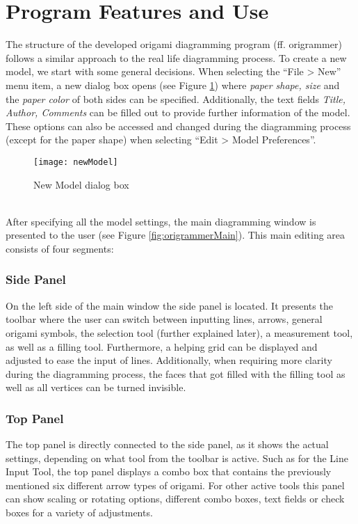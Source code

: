 
\section{Program Features and Use}
\label{program}

The structure of the developed origami diagramming program (ff. \gls{origrammer}) follows a similar approach to the real life diagramming process. To create a new model, we start with some general decisions. When selecting the ``File > New'' menu item, a new dialog box opens (see Figure \ref{fig:newModel}) where \emph{paper shape, size} and the \emph{paper color} of both sides can be specified. Additionally, the text fields \emph{Title, Author, Comments} can be filled out to provide further information of the model. These options can also be accessed and changed during the diagramming process (except for the paper shape) when selecting ``Edit > Model Preferences''.
\begin{figure}[htbp]
	\centering
	\texttt{[image: newModel]}
	\caption{New Model dialog box}
	\label{fig:newModel}
\end{figure}\\
After specifying all the model settings, the main diagramming window is presented to the user (see Figure \ref{fig:origrammerMain}). This main editing area consists of four segments:

\subsubsection*{Side Panel}
On the left side of the main window the side panel is located. It presents the toolbar where the user can switch between inputting lines, arrows, general origami symbols, the selection tool (further explained later), a measurement tool, as well as a filling tool. Furthermore, a helping grid can be displayed and adjusted to ease the input of lines. Additionally, when requiring more clarity during the diagramming process, the faces that got filled with the filling tool as well as all vertices can be turned invisible.

\subsubsection*{Top Panel}
The top panel is directly connected to the side panel, as it shows the actual settings, depending on what tool from the toolbar is active. Such as for the Line Input Tool, the top panel displays a combo box that contains the previously mentioned six different arrow types of origami. For other active tools this panel can show scaling or rotating options, different combo boxes, text fields or check boxes for a variety of adjustments.

